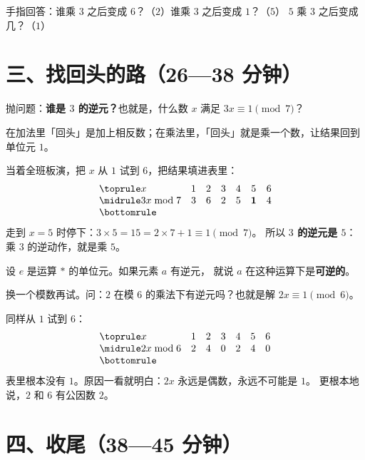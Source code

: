 \begin{caozuo}
  手指回答：谁乘 \(3\) 之后变成 \(6\)？（\(2\)）谁乘 \(3\) 之后变成 \(1\)？（\(5\)）
  \(5\) 乘 \(3\) 之后变成几？（\(1\)）
\end{caozuo}

\section*{三、找回头的路（26—38 分钟）}

抛问题：\textbf{谁是 \(3\) 的逆元？}也就是，什么数 \(x\) 满足 \(3x\equiv1\pmod7\)？

在加法里「回头」是加上相反数；在乘法里，「回头」就是乘一个数，让结果回到单位元 \(1\)。

\begin{caozuo}
  当着全班板演，把 \(x\) 从 \(1\) 试到 \(6\)，把结果填进表里：
  \[
  \begin{array}{@{}lcccccc@{}}
    \toprule
    x & 1 & 2 & 3 & 4 & 5 & 6 \\
    \midrule
    3x \bmod 7 & 3 & 6 & 2 & 5 & \mathbf{1} & 4 \\
    \bottomrule
  \end{array}
  \]
  走到 \(x=5\) 时停下：\(3\times5=15=2\times7+1\equiv1\pmod7\)。
  所以 \textbf{\(3\) 的逆元是 \(5\)}：乘 \(3\) 的逆动作，就是乘 \(5\)。
\end{caozuo}

\begin{definition}[可逆]
  设 \(e\) 是运算 \(*\) 的单位元。如果元素 \(a\) 有逆元，
  就说 \(a\) 在这种运算下是\textbf{可逆的}。
\end{definition}

换一个模数再试。问：\(2\) 在模 \(6\) 的乘法下有逆元吗？也就是解 \(2x\equiv1\pmod6\)。

\begin{caozuo}
  同样从 \(1\) 试到 \(6\)：
  \[
  \begin{array}{@{}lcccccc@{}}
    \toprule
    x & 1 & 2 & 3 & 4 & 5 & 6 \\
    \midrule
    2x \bmod 6 & 2 & 4 & 0 & 2 & 4 & 0 \\
    \bottomrule
  \end{array}
  \]
  表里根本没有 \(1\)。原因一看就明白：\(2x\) 永远是偶数，永远不可能是 \(1\)。
  更根本地说，\(2\) 和 \(6\) 有公因数 \(2\)。
\end{caozuo}

\section*{四、收尾（38—45 分钟）}

